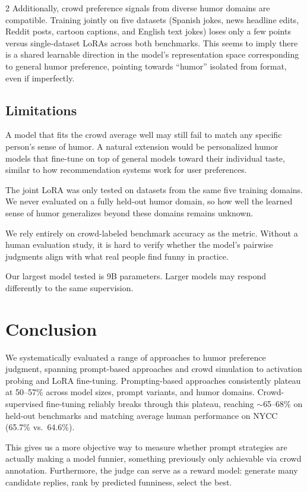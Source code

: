 \documentclass[10pt, a4paper]{article}
\begin{document}
\begin{multicols}{2}
Additionally, crowd preference signals from diverse humor domains are compatible. Training jointly on five datasets (Spanish jokes, news headline edits, Reddit posts, cartoon captions, and English text jokes) loses only a few points versus single-dataset LoRAs across both benchmarks. This seems to imply there is a shared learnable direction in the model's representation space corresponding to general humor preference, pointing towards ``humor'' isolated from format, even if imperfectly.

\subsection{Limitations}

A model that fits the crowd average well may still fail to match any specific person's sense of humor. A natural extension would be personalized humor models that fine-tune on top of general models toward their individual taste, similar to how recommendation systems work for user preferences.

The joint LoRA was only tested on datasets from the same five training domains. We never evaluated on a fully held-out humor domain, so how well the learned sense of humor generalizes beyond these domains remains unknown.

We rely entirely on crowd-labeled benchmark accuracy as the metric. Without a human evaluation study, it is hard to verify whether the model's pairwise judgments align with what real people find funny in practice.

Our largest model tested is 9B parameters. Larger models may respond differently to the same supervision.

\section{Conclusion}

We systematically evaluated a range of approaches to humor preference judgment, spanning prompt-based approaches and crowd simulation to activation probing and LoRA fine-tuning. Prompting-based approaches consistently plateau at 50--57\% across model sizes, prompt variants, and humor domains. Crowd-supervised fine-tuning reliably breaks through this plateau, reaching $\sim$65--68\% on held-out benchmarks and matching average human performance on NYCC (65.7\% vs.\ 64.6\%).

This gives us a more objective way to measure whether prompt strategies are actually making a model funnier, something previously only achievable via crowd annotation. Furthermore, the judge can serve as a reward model: generate many candidate replies, rank by predicted funniness, select the best.


\end{multicols}
\end{document}
